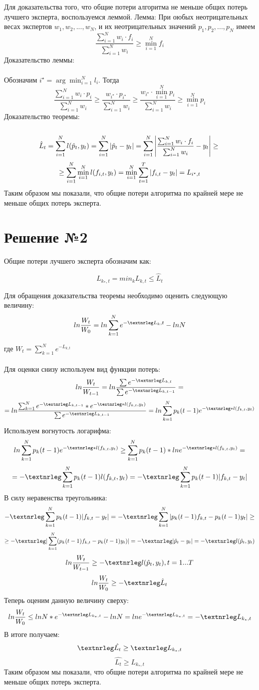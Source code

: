 \documentclass{article}
\newcommand{\mathnrleg}{\textnormal{\textnrleg}}
\begin{document}
Для доказательства того, что общие потери алгоритма не меньше общих потерь лучшего эксперта, воспользуемся леммой.
Лемма: При оюбых неотрицательных весах экспертов $w_1, w_2, ..., w_N$, и их неотрицательных значений  $p_1, p_2, ..., p_N$ имеем
$$
\frac{\sum_{i=1}^N w_i\cdot f_i}{\sum_{i=1}^N w_i} \geq \min_{i=1}^N f_i
$$
Доказательство леммы: \\\\
Обозначим $i^\star = \arg\min_{i=1}^N l_i$. Тогда
$$
\frac{\sum_{i=1}^N w_i\cdot p_i}{\sum_{i=1}^N w_i} \geq \frac{w_{i^\star} \cdot p_{i^\star}}{\sum_{i=1}^N w_i} \geq \frac{w_{i^\star} \cdot \min_{i=1}^N p_i}{\sum_{i=1}^N w_i} \geq \min_{i=1}^N p_i
$$
Доказательство теоремы: \\\\
$$
\hat{L}_t = \sum_{i=1}^N l(\hat{p}_t, y_t) = \sum_{i=1}^N |\hat{p}_t - y_t| = \sum_{i=1}^N \left|\frac{\sum_{i=1}^N w_i\cdot f_i}{\sum_{i=1}^N w_i} - y_t\right| \geq \\
$$
$$
\geq \sum_{i=1}^N \min_{i=1}^N l(f_{i,t},y_t) = \min_{i=1}^N \sum_{t=1}^T \left|f_{i,t} - y_t\right| = L_{i^\star,t} \\\\
$$
Таким образом мы показали, что общие потери алгоритма по крайней мере не меньше общих потерь эксперта.

\section{Решение №2}
Общие потери лучшего эксперта обозначим как:

$$L_{k_*,t}=min_k L_{k,t} \leq \hat{L}_t$$

Для обращения доказательства теоремы необходимо оценить следующую величину:
$$ln\frac{W_t}{W_0} = ln\sum_{k=1}^Ne^{-\mathnrleg L_k,t} - lnN$$

где $W_t = \sum_{k=1}^Ne^{-L_{k,t}}$ \\\\
Для оценки снизу используем вид функции потерь:
$$ln\frac{W_t}{W_{t-1}} = ln\frac{\sum e^{-\mathnrleg L_{k,t}}}{\sum e^{-\mathnrleg L_{k,t-1}}}=$$
$$=ln\frac{\sum_{k=1}^N e^{-\mathnrleg L_{k,t-1}} * e^{-\mathnrleg * l(f_{k,t}, y_t)}}{\sum e^{-\mathnrleg L_{k,t-1}}}= ln\sum_{k=1}^Np_k(t-1)e^{-\mathnrleg * l(f_{k,t}, y_t)}$$
Используем вогнутость логарифма:
$$ln\sum_{k=1}^Np_k(t-1)e^{-\mathnrleg * l(f_{k,t}, y_t)} \geq \sum_{k=1}^Np_k(t-1)*lne^{-\mathnrleg * l(f_{k,t},y_t)}=$$
$$=-\mathnrleg \sum_{k=1}^Np_k(t-1)l(f_{k,t},y_t) = -\mathnrleg \sum_{k=1}^N p_k(t-1)|f_{k,t} - y_t|$$
В силу неравенства треугольника:
$$ -\mathnrleg \sum_{k=1}^N p_k(t-1)|f_{k,t} - y_t|=-\mathnrleg \sum_{k=1}^N|p_k(t-1)f_{k,t} - p_k(t-1)y_t| \geq $$
$$ \geq -\mathnrleg |\sum_{k=1}^N(p_k(t-1)f_{k,t} - p_k(t-1)y_t)| = -\mathnrleg |\hat{p}_t - y_t| = -\mathnrleg l(\hat{p}_t, y_t) $$
$$
ln\frac{W_t}{W_{t-1}} \geq -\mathnrleg l(\hat{p}_t, y_t), t = 1... T
$$
$$
ln\frac{W_t}{W_0} \geq -\mathnrleg \hat{L}_t
$$
Теперь оценим данную величину сверху:
$$ln\frac{W_t}{W_0} \leq ln N*e^{-\mathnrleg L_{k_*,t}} - ln N = ln e^{-\mathnrleg L_{k_*,t}} = -\mathnrleg L_{k_*,t}$$
В итоге получаем:
$$\mathnrleg \hat{L_t} \geq \mathnrleg L_{k_*,t} $$
$$\hat{L_t} \geq L_{k_*,t} $$
Таким образом мы показали, что общие потери алгоритма по крайней мере
не меньше общих потерь эксперта.
\end{document}
